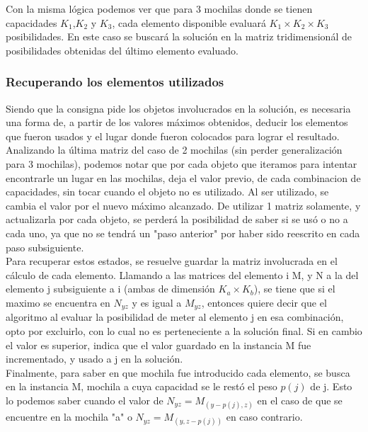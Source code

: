   Con la misma lógica podemos ver que para 3 mochilas donde se tienen capacidades  $K_{1}$,$K_{2}$ y $K_{3}$, cada elemento disponible evaluará $K_{1} \times K_{2} \times K_{3}$ posibilidades. En este caso se buscará la solución en la matriz tridimensionál de posibilidades obtenidas del último elemento evaluado.

\subsubsection*{Recuperando los elementos utilizados}

Siendo que la consigna pide los objetos involucrados en la solución, es necesaria una forma de, a partir de los valores máximos obtenidos, deducir los elementos que fueron usados y el lugar donde fueron colocados para lograr el resultado.\\

Analizando la última matriz del caso de 2 mochilas (sin perder generalización para 3 mochilas), podemos notar que por cada objeto que iteramos para intentar encontrarle un lugar en las mochilas, deja el valor previo, de cada combinacion de capacidades, sin tocar cuando el objeto no es utilizado. Al ser utilizado, se cambia el valor por el nuevo máximo alcanzado. De utilizar 1 matriz solamente, y actualizarla por cada objeto, se perderá la posibilidad de saber si se usó o no a cada uno, ya que no se tendrá un "paso anterior" por haber sido reescrito en cada paso subsiguiente. \\

Para recuperar estos estados, se resuelve guardar la matriz involucrada en el c\'alculo de cada elemento. Llamando a las matrices del elemento i M, y N a la del elemento j subsiguiente a i (ambas de dimensión $K_{a} \times K_{b}$), se tiene que si el maximo se encuentra en $N_{yz}$ y es igual a $M_{yz}$, entonces quiere decir que el algoritmo al evaluar la posibilidad de meter al elemento j en esa combinación, opto por excluirlo, con lo cual no es perteneciente a la solución final. Si en cambio el valor es superior, indica que el valor guardado en la instancia M fue incrementado, y usado a j en la solución.\\

Finalmente, para saber en que mochila fue introducido cada elemento, se busca en la instancia M, mochila a cuya capacidad se le restó el peso $p(j)$ de j. Esto lo podemos saber cuando el valor de $N_{yz} = M_{(y-p(j),z)}$ en el caso de que se encuentre en la mochila "a" o $N_{yz} = M_{(y,z-p(j))}$ en caso contrario.\\

